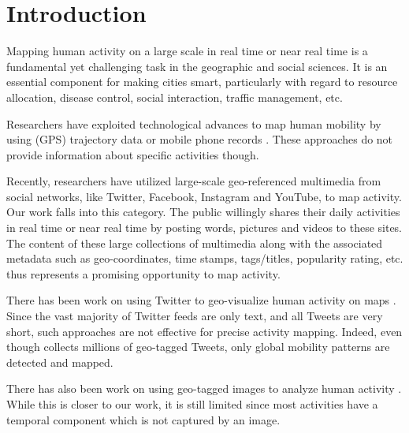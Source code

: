 \documentclass[sigconf]{acmart}
\begin{document}
	\maketitle
	
	\section{Introduction}
	\label{sec:introduction}
	Mapping human activity on a large scale in real time or near real time is a fundamental yet challenging task in the geographic and social sciences. It is an essential component for making cities smart, particularly with regard to resource allocation, disease control, social interaction, traffic management, etc. 
	
	Researchers have exploited technological advances to map human mobility by using (GPS) trajectory data \cite{Density_Demsar_2010,Trajectory_Qi_2013,LULC_Activity_Li_2017} or mobile phone records \cite{Activity_Aware_Phithakkitnukoon_2010,Mobile_Sagl_2014,Phone_NE_2015,Mobility_Yang_2016,Generative_Yin_2017}. These approaches do not provide information about specific activities though.
	
	Recently, researchers have utilized large-scale geo-referenced multimedia from social networks, like Twitter, Facebook, Instagram and YouTube, to map activity. Our work falls into this category. The public willingly shares their daily activities in real time or near real time by posting words, pictures and videos to these sites. The content of these large collections of multimedia along with the associated metadata such as geo-coordinates, time stamps, tags/titles, popularity rating, etc. thus represents a promising opportunity to map activity.
	
	There has been work on using Twitter to geo-visualize human activity on maps \cite{City_Story_Kling_2012,Twitter_Hawelka_2014}. Since the vast majority of Twitter feeds are only text, and all Tweets are very short, such approaches are not effective for precise activity mapping. Indeed, even though \cite{Twitter_Hawelka_2014} collects millions of geo-tagged Tweets, only global mobility patterns are detected and mapped.
	
	There has also been work on using geo-tagged images to analyze human activity \cite{Flickr_Kisilevich_2010,VGI_Sun_2013,Magnetism_Paldino_2015,Emotions_Hauthal_2016,Travel_Yuan_2016}. While this is closer to our work, it is still limited since most activities have a temporal component which is not captured by an image.
	
\end{document}
